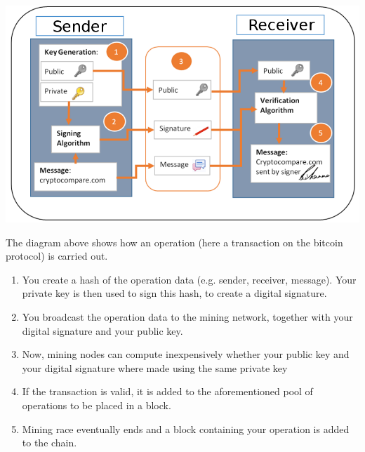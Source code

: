 \begin{center}
   \includegraphics[scale = 0.35]{diagrams/transaction_diagram.png}
\end{center}

The diagram above shows how an operation (here a transaction on the bitcoin protocol) is carried out.

\begin{enumerate}
  
  \item You create a hash of the operation data (e.g. sender, receiver, message).
    Your private key is then used to sign this hash, to create a digital signature.

  \item You broadcast the operation data to the mining network, together with your digital signature and your public key.

  \item Now, mining nodes can compute inexpensively whether your public key and your digital
    signature where made using the same private key
    
  \item If the transaction is valid, it is added to the aforementioned pool of operations to be placed in a block.

  \item Mining race eventually ends and a block containing your operation is added to the chain.
    
\end{enumerate}
